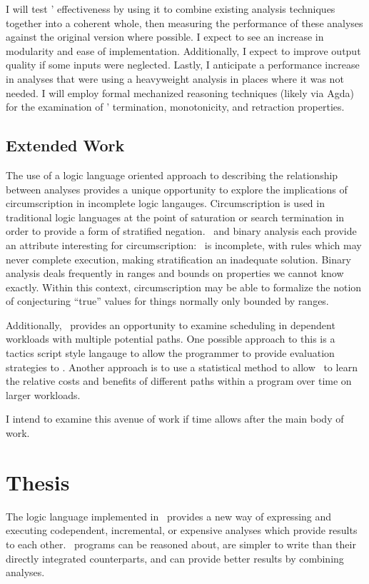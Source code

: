 I will test \sysname' effectiveness by using it to combine existing analysis techniques together into a coherent whole, then measuring the performance of these analyses against the original version where possible.
I expect to see an increase in modularity and ease of implementation.
Additionally, I expect to improve output quality if some inputs were neglected.
Lastly, I anticipate a performance increase in analyses that were using a heavyweight analysis in places where it was not needed.
I will employ formal mechanized reasoning techniques (likely via Agda) for the examination of \sysname' termination, monotonicity, and retraction properties.

\subsection{Extended Work}
The use of a logic language oriented approach to describing the relationship between analyses provides a unique opportunity to explore the implications of circumscription in incomplete logic langauges.
Circumscription is used in traditional logic languages at the point of saturation or search termination in order to provide a form of stratified negation.
\sysname\ and binary analysis each provide an attribute interesting for circumscription:
\sysname\ is incomplete, with rules which may never complete execution, making stratification an inadequate solution.
Binary analysis deals frequently in ranges and bounds on properties we cannot know exactly.
Within this context, circumscription may be able to formalize the notion of conjecturing ``true'' values for things normally only bounded by ranges.

Additionally, \sysname\ provides an opportunity to examine scheduling in dependent workloads with multiple potential paths.
One possible approach to this is a tactics script style langauge to allow the programmer to provide evaluation strategies to \sysname.
Another approach is to use a statistical method to allow \sysname\ to learn the relative costs and benefits of different paths within a program over time on larger workloads.

I intend to examine this avenue of work if time allows after the main body of work.
\section{Thesis}
The logic language implemented in \sysname\ provides a new way of expressing and executing codependent, incremental, or expensive analyses which provide results to each other. \sysname\ programs can be reasoned about, are simpler to write than their directly integrated counterparts, and can provide better results by combining analyses.
